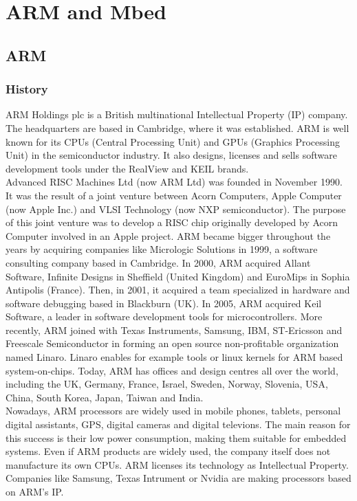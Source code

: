\documentclass[pdftex,10pt,a4paper]{report}
\begin{document}
\tableofcontents

\chapter{ARM and Mbed}
\section{ARM}
\subsection{History}
ARM Holdings plc is a British multinational Intellectual Property (IP) company. The headquarters are based in Cambridge, where it was established. ARM is well known for its CPUs (Central Processing Unit) and GPUs (Graphics Processing Unit) in the semiconductor industry. It also designs, licenses and sells software development tools under the RealView and KEIL brands.
\\

Advanced RISC Machines Ltd (now ARM Ltd) was founded in November 1990. It was the result of a joint venture between Acorn Computers, Apple Computer (now Apple Inc.) and VLSI Technology (now NXP semiconductor). The purpose of this joint venture was to develop a RISC chip originally developed by Acorn Computer involved in an Apple project. ARM became bigger throughout the years by acquiring companies like Micrologic Solutions in 1999, a software consulting company based in Cambridge. In 2000, ARM acquired Allant Software, Infinite Designs in Sheffield (United Kingdom) and EuroMips in Sophia Antipolis (France). Then, in 2001, it acquired a team specialized in hardware and software debugging based in Blackburn (UK). In 2005, ARM acquired Keil Software, a leader in software development tools for microcontrollers. More recently, ARM joined with Texas Instruments, Samsung, IBM, ST-Ericsson and Freescale Semiconductor in forming an open source non-profitable organization named Linaro. Linaro enables for example tools or linux kernels for ARM based system-on-chips. Today, ARM has offices and design centres all over the world, including the UK, Germany, France, Israel, Sweden, Norway, Slovenia, USA, China, South Korea, Japan, Taiwan and India. 
\\

Nowadays, ARM processors are widely used in mobile phones, tablets, personal digital assistants, GPS, digital cameras and digital televions. The main reason for this success is their low power consumption, making them suitable for embedded systems. Even if ARM products are widely used, the company itself does not manufacture its own CPUs. ARM licenses its technology as Intellectual Property. Companies like Samsung, Texas Intrument or Nvidia are making processors based on ARM's IP.
\end{document}

